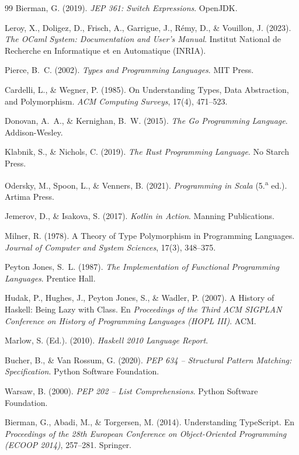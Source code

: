 \documentclass[12pt, a4paper]{article}
\begin{document}
\begin{thebibliography}{99}
Bierman, G. (2019). \textit{JEP 361: Switch Expressions}. OpenJDK.

Leroy, X., Doligez, D., Frisch, A., Garrigue, J., Rémy, D., \& Vouillon, J.
(2023). \textit{The OCaml System: Documentation and User's Manual}. Institut
National de Recherche en Informatique et en Automatique (INRIA).

Pierce, B.~C. (2002). \textit{Types and Programming Languages}. MIT Press.

Cardelli, L., \& Wegner, P. (1985). On Understanding Types, Data Abstraction,
and Polymorphism. \textit{ACM Computing Surveys}, 17(4), 471--523.

Donovan, A.~A., \& Kernighan, B.~W. (2015). \textit{The Go Programming
Language}. Addison-Wesley.

Klabnik, S., \& Nichols, C. (2019). \textit{The Rust Programming Language}.
No Starch Press.

Odersky, M., Spoon, L., \& Venners, B. (2021). \textit{Programming in Scala}
(5.\textsuperscript{a} ed.). Artima Press.

Jemerov, D., \& Isakova, S. (2017). \textit{Kotlin in Action}. Manning
Publications.

Milner, R. (1978). A Theory of Type Polymorphism in Programming Languages.
\textit{Journal of Computer and System Sciences}, 17(3), 348--375.

Peyton Jones, S.~L. (1987). \textit{The Implementation of Functional
Programming Languages}. Prentice Hall.

Hudak, P., Hughes, J., Peyton Jones, S., \& Wadler, P. (2007). A History of
Haskell: Being Lazy with Class. En \textit{Proceedings of the Third ACM
SIGPLAN Conference on History of Programming Languages (HOPL III)}. ACM.

Marlow, S. (Ed.). (2010). \textit{Haskell 2010 Language Report}.

Bucher, B., \& Van Rossum, G. (2020). \textit{PEP 634 -- Structural Pattern
Matching: Specification}. Python Software Foundation.

Warsaw, B. (2000). \textit{PEP 202 -- List Comprehensions}. Python Software
Foundation.

Bierman, G., Abadi, M., \& Torgersen, M. (2014). Understanding TypeScript.
En \textit{Proceedings of the 28th European Conference on Object-Oriented
Programming (ECOOP 2014)}, 257--281. Springer.


\end{thebibliography}
\end{document}

